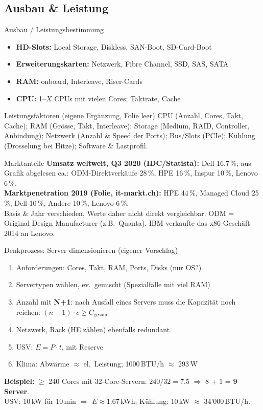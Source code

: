 \documentclass[a4paper, fontsize=7pt]{scrartcl}
\begin{document}
\subsection{Ausbau \& Leistung}

\begin{mainbox}{Ausbau / Leistungsbestimmung}
\begin{itemize}
    \item \textbf{HD-Slots:} Local Storage, Diskless, SAN-Boot, SD-Card-Boot
    \item \textbf{Erweiterungskarten:} Netzwerk, Fibre Channel, SSD, SAS, SATA
    \item \textbf{RAM:} onboard, Interleave, Riser-Cards
    \item \textbf{CPU:} 1--$X$ CPUs mit vielen Cores; Taktrate, Cache
\end{itemize}
\end{mainbox}

\begin{subbox}{Leistungsfaktoren (eigene Ergänzung, Folie leer)}
CPU (Anzahl, Cores, Takt, Cache); RAM (Grösse, Takt, Interleave); Storage
(Medium, RAID, Controller, Anbindung); Netzwerk (Anzahl \& Speed der Ports);
Bus/Slots (PCIe); Kühlung (Drosselung bei Hitze); Software \& Lastprofil.
\end{subbox}

\begin{subbox}{Marktanteile}
\textbf{Umsatz weltweit, Q3 2020 (IDC/Statista):} Dell 16.7\,\%; aus Grafik
abgelesen ca.: ODM-Direktverkäufe 28\,\%, HPE 16\,\%, Inspur 10\,\%, Lenovo
6\,\%.\\
\textbf{Marktpenetration 2019 (Folie, it-markt.ch):} HPE 44\,\%, Managed Cloud
25\,\%, Dell 10\,\%, Andere 10\,\%, Lenovo 6\,\%.\\
Basis \& Jahr verschieden, Werte daher nicht direkt vergleichbar.
ODM = Original Design Manufacturer (z.B.\ Quanta). IBM verkaufte das
x86-Geschäft 2014 an Lenovo.
\end{subbox}

\begin{subbox}{Denkprozess: Server dimensionieren (eigener Vorschlag)}
\begin{enumerate}
    \item Anforderungen: Cores, Takt, RAM, Ports, Disks (nur OS?)
    \item Servertypen wählen, ev.\ gemischt (Spezialfälle mit viel RAM)
    \item Anzahl mit \textbf{N+1}: nach Ausfall eines Servers muss die Kapazität
          noch reichen: $(n-1) \cdot c \ge C_{\text{gesamt}}$
    \item Netzwerk, Rack (HE zählen) ebenfalls redundant
    \item USV: $E = P \cdot t$, mit Reserve
    \item Klima: Abwärme $\approx$ el.\ Leistung; 1000\,BTU/h $\approx$ 293\,W
\end{enumerate}
\textbf{Beispiel:} $\ge$ 240 Cores mit 32-Core-Servern:
$240/32 = 7.5$ $\Rightarrow$ 8 + 1 = \textbf{9 Server}.\\
USV: 10\,kW für 10\,min $\Rightarrow$ $E \approx 1.67$\,kWh;
Kühlung: 10\,kW $\approx$ 34'000\,BTU/h.
\end{subbox}
\end{document}
